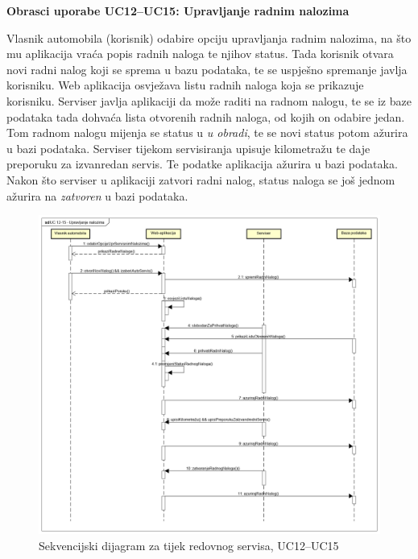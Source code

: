 \textbf{Obrasci uporabe UC12--UC15: Upravljanje radnim nalozima}
	
\noindent Vlasnik automobila (korisnik) odabire opciju upravljanja radnim nalozima, na što mu aplikacija vraća popis radnih naloga te njihov status. Tada korisnik otvara novi radni nalog koji se sprema u bazu podataka, te se uspješno spremanje javlja korisniku. Web aplikacija osvježava listu radnih naloga koja se prikazuje korisniku. Serviser javlja aplikaciji da može raditi na radnom nalogu, te se iz baze podataka tada dohvaća lista otvorenih radnih naloga, od kojih on odabire jedan. Tom radnom nalogu mijenja se status u \textit{u obradi}, te se novi status potom ažurira u bazi podataka. Serviser tijekom servisiranja upisuje kilometražu te daje preporuku za izvanredan servis. Te podatke aplikacija ažurira u bazi podataka. Nakon što serviser u aplikaciji zatvori radni nalog, status naloga se još jednom ažurira na \textit{zatvoren} u bazi podataka.
	
	\begin{figure}[H]
		\includegraphics[width=\linewidth]{dijagrami/seq-dia1.png}
		\centering
		\caption{Sekvencijski dijagram za tijek redovnog servisa, UC12--UC15}
		\label{fig:sequence-diagram1}
	\end{figure}




